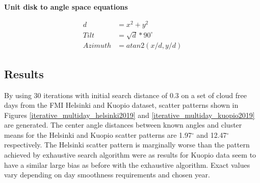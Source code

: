 \noindent \textbf{Unit disk to angle space equations}

\begin{equation}
\begin{split}
\label{unit_circle_to_angle_space}
d &= x^2+y^2\\
Tilt &= \sqrt{d}*90^\circ\\
Azimuth &= atan2(x/d, y/d)
\end{split}
\end{equation}

\pagebreak

\subsection{Results}
By using 30 iterations with initial search distance of 0.3 on a set of cloud free days from the FMI Helsinki and Kuopio dataset, scatter patterns shown in Figures \ref{iterative_multiday_helsinki2019} and \ref{iterative_multiday_kuopio2019} are generated. The center angle distances between known angles and cluster means for the Helsinki and Kuopio scatter patterns are 1.97$^\circ$ and 12.47$^\circ$ respectively. The Helsinki scatter pattern is marginally worse than the pattern achieved by exhaustive search algorithm were as results for Kuopio data seem to have a similar large bias as before with the exhaustive algorithm. Exact values vary depending on day smoothness requirements and chosen year.


